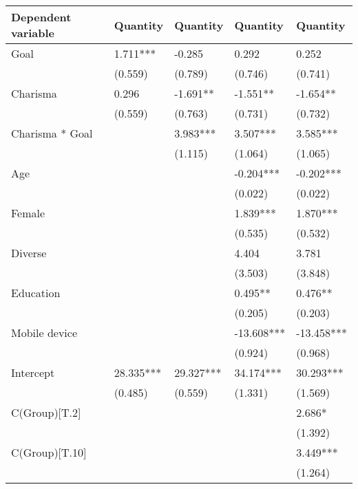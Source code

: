 \begin{tabular}{lllll}
\toprule
Dependent variable &   Quantity &   Quantity &    Quantity &    Quantity \\
\midrule
Goal            &   1.711*** &     -0.285 &       0.292 &       0.252 \\
                &    (0.559) &    (0.789) &     (0.746) &     (0.741) \\
Charisma        &      0.296 &   -1.691** &    -1.551** &    -1.654** \\
                &    (0.559) &    (0.763) &     (0.731) &     (0.732) \\
Charisma * Goal &            &   3.983*** &    3.507*** &    3.585*** \\
                &            &    (1.115) &     (1.064) &     (1.065) \\
Age             &            &            &   -0.204*** &   -0.202*** \\
                &            &            &     (0.022) &     (0.022) \\
Female          &            &            &    1.839*** &    1.870*** \\
                &            &            &     (0.535) &     (0.532) \\
Diverse         &            &            &       4.404 &       3.781 \\
                &            &            &     (3.503) &     (3.848) \\
Education       &            &            &     0.495** &     0.476** \\
                &            &            &     (0.205) &     (0.203) \\
Mobile device   &            &            &  -13.608*** &  -13.458*** \\
                &            &            &     (0.924) &     (0.968) \\
Intercept       &  28.335*** &  29.327*** &   34.174*** &   30.293*** \\
                &    (0.485) &    (0.559) &     (1.331) &     (1.569) \\
C(Group)[T.2]   &            &            &             &      2.686* \\
                &            &            &             &     (1.392) \\
C(Group)[T.10]  &            &            &             &    3.449*** \\
                &            &            &             &     (1.264) \\

\end{tabular}
